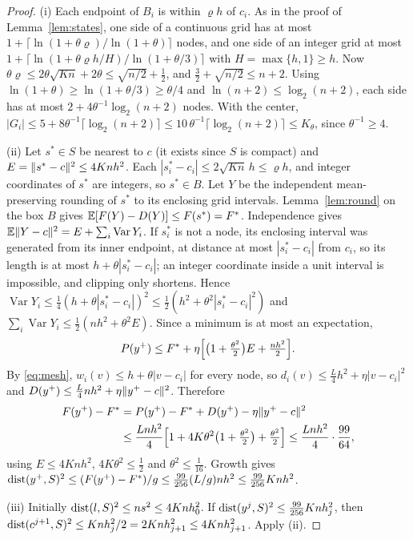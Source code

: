 \begin{proof}
(i) Each endpoint of $B_i$ is within $\varrho h$ of $c_i$. As in the proof of
Lemma~\ref{lem:states}, one side of a continuous grid has at most
$1+\lceil\ln(1+\theta\varrho)/\ln(1+\theta)\rceil$ nodes, and one side of an
integer grid at most $1+\lceil\ln(1+\theta\varrho h/H)/\ln(1+\theta/3)\rceil$
with $H=\max\{h,1\}\ge h$. Now
$\theta\varrho\le2\theta\sqrt{Kn}+2\theta\le\sqrt{n/2}+\frac12$, and
$\frac32+\sqrt{n/2}\le n+2$. Using $\ln(1+\theta)\ge\ln(1+\theta/3)\ge\theta/4$
and $\ln(n+2)\le\log_2(n+2)$, each side has at most
$2+4\theta^{-1}\log_2(n+2)$ nodes. With the center, $|G_i|\le5+8\theta^{-1}
\lceil\log_2(n+2)\rceil\le10\,\theta^{-1}\lceil\log_2(n+2)\rceil\le K_\theta$,
since $\theta^{-1}\ge4$.

(ii) Let $s^*\in S$ be nearest to $c$ (it exists since $S$ is compact) and
$E=\lVert s^*-c\rVert^2\le4Knh^2$. Each $|s^*_i-c_i|\le2\sqrt{Kn}\,h\le\varrho h$,
and integer coordinates of $s^*$ are integers, so $s^*\in B$. Let $Y$ be the
independent mean-preserving rounding of $s^*$ to its enclosing grid
intervals. Lemma~\ref{lem:round} on the box $B$ gives
$\mathbb E[F(Y)-D(Y)]\le F(s^*)=F^*$. Independence gives
$\mathbb E\lVert Y-c\rVert^2=E+\sum_i\operatorname{Var}Y_i$. If $s^*_i$ is not a node, its
enclosing interval was generated from its inner endpoint, at distance at most
$|s^*_i-c_i|$ from $c_i$, so its length is at most $h+\theta|s^*_i-c_i|$;
an integer coordinate inside a unit interval is impossible, and clipping only
shortens. Hence
$\operatorname{Var}Y_i\le\frac14(h+\theta|s^*_i-c_i|)^2\le\frac12(h^2+\theta^2|s^*_i-c_i|^2)$
and $\sum_i\operatorname{Var}Y_i\le\frac12(nh^2+\theta^2E)$. Since a minimum
is at most an expectation,
\[
P(y^+)\le F^*+\eta\Bigl[\bigl(1+\tfrac{\theta^2}2\bigr)E+\tfrac{nh^2}2\Bigr].
\]
By \eqref{eq:mesh}, $w_i(v)\le h+\theta|v-c_i|$ for every node, so
$d_i(v)\le\frac L4h^2+\eta|v-c_i|^2$ and
$D(y^+)\le\frac L4nh^2+\eta\lVert y^+-c\rVert^2$. Therefore
\begin{align*}
F(y^+)-F^*&=P(y^+)-F^*+D(y^+)-\eta\lVert y^+-c\rVert^2\\
&\le\frac{Lnh^2}4\Bigl[1+4K\theta^2\bigl(1+\tfrac{\theta^2}2\bigr)+\tfrac{\theta^2}2\Bigr]
\le\frac{Lnh^2}4\cdot\frac{99}{64},
\end{align*}
using $E\le4Knh^2$, $4K\theta^2\le\frac12$ and $\theta^2\le\frac1{16}$.
Growth gives $\operatorname{dist}(y^+,S)^2\le(F(y^+)-F^*)/g\le\frac{99}{256}(L/g)nh^2\le
\frac{99}{256}Knh^2$.

(iii) Initially $\operatorname{dist}(l,S)^2\le ns^2\le4Knh_0^2$. If
$\operatorname{dist}(y^j,S)^2\le\frac{99}{256}Knh_j^2$, then
$\operatorname{dist}(c^{j+1},S)^2\le Knh_j^2/2=2Knh_{j+1}^2\le4Knh_{j+1}^2$. Apply (ii).


\end{proof}
